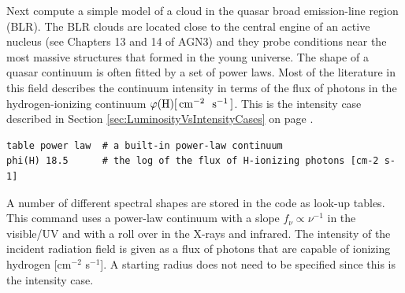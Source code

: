 \documentclass[12pt,twoside]{article}
\begin{document}
Next compute a simple model of a cloud in the quasar
broad emission-line region (BLR).
The BLR clouds are located close to the central engine of an active nucleus
(see Chapters 13 and 14 of AGN3) and they probe conditions near the most
massive structures that formed in the young universe.  The shape of a quasar
continuum is often fitted by a set of power laws.  Most of the literature
in this field describes the continuum intensity in terms of the flux of
photons in the hydrogen-ionizing continuum
$\varphi(\mathrm{H}) [ \mbox{${\rm\thinspace cm}^{-2}\,$}\ \mbox{${\rm\thinspace s}^{-1}\,$} ]$.
This is the intensity case described in
Section \ref{sec:LuminosityVsIntensityCases}
on page \pageref{sec:LuminosityVsIntensityCases}.
\small
\begin{verbatim}
table power law  # a built-in power-law continuum
phi(H) 18.5      # the log of the flux of H-ionizing photons [cm-2 s-1]
\end{verbatim}
\normalsize
A number of different spectral shapes are stored in the code as look-up
tables.  This  command uses
a power-law continuum with a slope $f_\nu \propto \nu^{-1}$
in the visible/UV and with a roll over in the X-rays and infrared.
The intensity of the incident radiation field is given as a flux of
photons that are capable of ionizing hydrogen [cm$^{-2}$ s$^{-1}$].
A starting radius does not need to be specified since this is
the intensity case.
\end{document}
